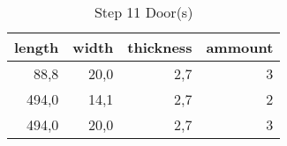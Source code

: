 \begin{table}[h!]
\centering
\caption{Step 11 Door(s)}
\begin{tabular}{rrrr}
\toprule
 length &  width &  thickness &  ammount \\
\midrule
   88,8 &   20,0 &        2,7 &        3 \\
  494,0 &   14,1 &        2,7 &        2 \\
  494,0 &   20,0 &        2,7 &        3 \\
\bottomrule
\end{tabular}
\end{table}
